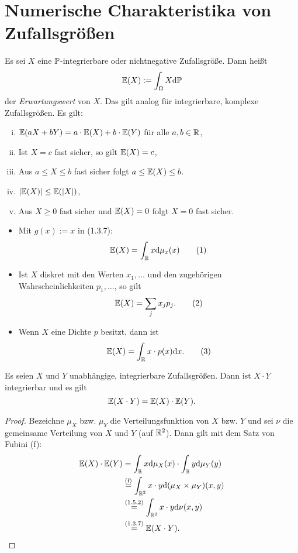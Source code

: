 \section{Numerische Charakteristika von Zufallsgrößen}
\begin{defn}
  Es sei $X$ eine $\mathbb{P}$-integrierbare oder nichtnegative Zufallsgröße. Dann
  heißt
  \[ \mathbb{E}(X) := \int_\Omega X \mathrm{d} \mathbb{P} \]
  der \emph{Erwartungswert} von $X$. Das gilt analog für integrierbare, komplexe
  Zufallsgrößen. Es gilt:
  \begin{enumerate}[(i)]
  \item $\mathbb{E}(aX + bY) = a \cdot \mathbb{E}(X) + b \cdot \mathbb{E}(Y)$ für alle $a,b \in \mathbb{R}$,
  \item Ist $X = c$ fast sicher, so gilt $\mathbb{E}(X) = c$,
  \item Aus $a \le X \le b$ fast sicher folgt $a \le \mathbb{E}(X) \le b$.
  \item $| \mathbb{E}(X) |  \le \mathbb{E}(|X|)$,
  \item Aus $X \ge 0$ fast sicher und $\mathbb{E}(X) = 0$ folgt $X = 0$ fast sicher.
  \end{enumerate}
\end{defn}

\begin{itemize}
\item Mit $g(x) := x$ in (1.3.7):
  \[ \mathbb{E}( X ) = \int_{\mathbb{R}} x \mathrm{d} \mu_x (x) \tag{1} \]
\item Ist $X$ diskret mit den Werten $x_1, \ldots$ und den zugehörigen
  Wahrscheinlichkeiten $p_1, \ldots$, so gilt
  \[ \mathbb{E}( X ) = \sum_{j} x_j p_j. \tag{2} \]
\item Wenn $X$ eine Dichte $p$ besitzt, dann ist
  \[ \mathbb{E}( X ) = \int_{\mathbb{R}} x \cdot p(x) \mathrm{d} x. \tag{3} \]
\end{itemize}

\begin{thm}
  Es seien $X$ und $Y$ unabhängige, integrierbare Zufallsgrößen. Dann ist $X
  \cdot Y$ integrierbar und es gilt
  \[ \mathbb{E}(X \cdot Y) = \mathbb{E}( X ) \cdot \mathbb{E}( Y ). \]
\end{thm}

\begin{proof}
  Bezeichne $\mu_X$ bzw. $\mu_Y$ die Verteilungsfunktion von $X$ bzw. $Y$ und
  sei $\nu$ die gemeinsame Verteilung von $X$ und $Y$ (auf $\mathbb{R}^2$). Dann
  gilt mit dem Satz von Fubini (f):
  \begin{align*}
    \mathbb{E}(X) \cdot \mathbb{E}(Y)
    & = \int_{\mathbb{R}} x \mathrm{d} \mu_X(x) \cdot \int_{\mathbb{R}} y \mathrm{d} \mu_Y(y) \\
    & \overset{(\text{f})}{=}
      \int_{\mathbb{R}^2} x \cdot y \mathrm{d} (\mu_X \times \mu_Y)(x, y) \\
    & \overset{(1.5.2)}{=}
      \int_{\mathbb{R}^2} x \cdot y \mathrm{d} \nu(x,y) \\
    & \overset{(1.3.7)}{=} \mathbb{E}( X \cdot Y ). \qedhere
  \end{align*}
\end{proof}

